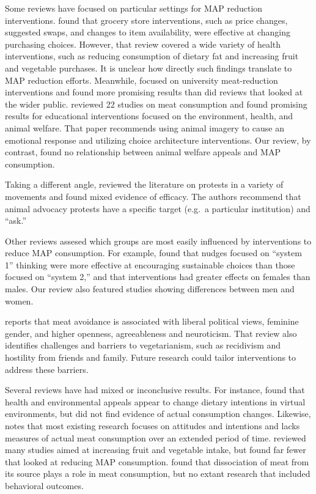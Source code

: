 \documentclass[sn-nature,referee,pdflatex]{sn-jnl}
\begin{document}
Some reviews have focused on particular settings for MAP reduction
interventions. \citep{hartmannboyce2018} found that grocery store
interventions, such as price changes, suggested swaps, and changes to
item availability, were effective at changing purchasing choices.
However, that review covered a wide variety of health interventions,
such as reducing consumption of dietary fat and increasing fruit and
vegetable purchases. It is unclear how directly such findings translate
to MAP reduction efforts. Meanwhile, \citep{chang2023} focused on
university meat-reduction interventions and found more promising results
than did reviews that looked at the wider public. \citep{harguess2020}
reviewed 22 studies on meat consumption and found promising results for
educational interventions focused on the environment, health, and animal
welfare. That paper recommends using animal imagery to cause an
emotional response and utilizing choice architecture interventions. Our
review, by contrast, found no relationship between animal welfare
appeals and MAP consumption.

Taking a different angle, \citep{adleberg2018} reviewed the literature
on protests in a variety of movements and found mixed evidence of
efficacy. The authors recommend that animal advocacy protests have a
specific target (e.g.~a particular institution) and ``ask.''

Other reviews assesed which groups are most easily influenced by
interventions to reduce MAP consumption. For example,
\citep{blackford2021} found that nudges focused on ``system 1'' thinking
were more effective at encouraging sustainable choices than those
focused on ``system 2,'' and that interventions had greater effects on
females than males. Our review also featured studies showing differences
between men and women.

\citep{rosenfeld2018} reports that meat avoidance is associated with
liberal political views, feminine gender, and higher openness,
agreeableness and neuroticism. That review also identifies challenges
and barriers to vegetarianism, such as recidivism and hostility from
friends and family. Future research could tailor interventions to
address these barriers.

Several reviews have had mixed or inconclusive results. For instance,
\citep{bianchi2018conscious} found that health and environmental appeals
appear to change dietary intentions in virtual environments, but did not
find evidence of actual consumption changes. Likewise,
\citep{kwasny2022} notes that most existing research focuses on
attitudes and intentions and lacks measures of actual meat consumption
over an extended period of time. \citep{taufik2019} reviewed many
studies aimed at increasing fruit and vegetable intake, but found far
fewer that looked at reducing MAP consumption. \citep{benningstad2020}
found that dissociation of meat from its source plays a role in meat
consumption, but no extant research that included behavioral outcomes.
\end{document}
